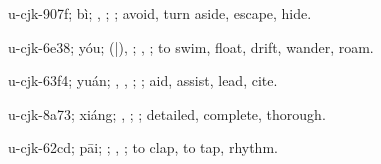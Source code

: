 \begin{multicols}{2}
{\cjkgGlue{}u-cjk-907f; bì; \cjkgGlue{}\cjkgGlue{}\cjkgGlue{}, \cjkgGlue{}\cjkgGlue{}\cjkgGlue{}; \cjkgGlue{}; avoid, turn aside, escape, hide.

\cjkgGlue{}u-cjk-6e38; yóu; \cjkgGlue{}\cjkgGlue{}(\cjkgGlue{}|\cjkgGlue{}), \cjkgGlue{}\cjkgGlue{}\cjkgGlue{}; \cjkgGlue{}, \cjkgGlue{}; to swim, float, drift, wander, roam.

\cjkgGlue{}u-cjk-63f4; yuán; \cjkgGlue{}, \cjkgGlue{}, \cjkgGlue{}; \cjkgGlue{}; aid, assist, lead, cite.

\cjkgGlue{}u-cjk-8a73; xiáng; \cjkgGlue{}\cjkgGlue{}\cjkgGlue{}, \cjkgGlue{}\cjkgGlue{}\cjkgGlue{}; \cjkgGlue{}; detailed, complete, thorough.

\cjkgGlue{}u-cjk-62cd; pāi; \cjkgGlue{}; \cjkgGlue{}, \cjkgGlue{}; to clap, to tap, rhythm.

}
\end{multicols}
